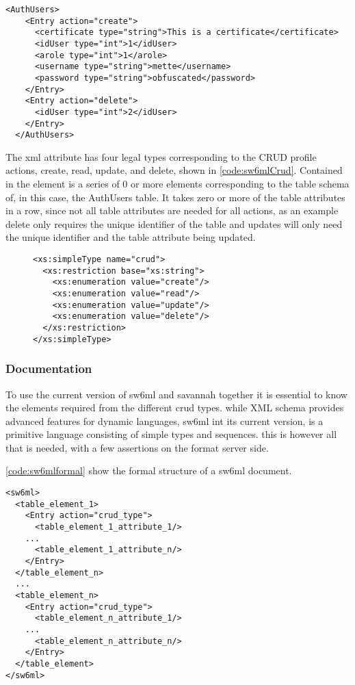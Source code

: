 \begin{Code}
\begin{lstlisting}[label=code:sw6mlExample01,caption=Example of sw6ml syntax]
 <AuthUsers>
    <Entry action="create">
      <certificate type="string">This is a certificate</certificate>
      <idUser type="int">1</idUser>
      <arole type="int">1</arole>
      <username type="string">mette</username>
      <password type="string">obfuscated</password>
    </Entry>
    <Entry action="delete">
      <idUser type="int">2</idUser>
    </Entry>
  </AuthUsers>
\end{lstlisting}
\end{Code}
The  xml attribute has four legal types corresponding to the CRUD profile actions, create, read, update, and delete, shown in \autoref{code:sw6mlCrud}.
Contained in the   element is a series of 0 or more elements corresponding to the table schema of, in this case, the AuthUsers table.
It takes zero or more of the table attributes in a row, since not all table attributes are needed for all actions, as an example delete only requires the unique identifier of the table and
updates will only need the unique identifier and the table attribute being updated.
\begin{figure}[H]
\begin{lstlisting}[label=code:sw6mlCrud,caption=sw6ml crud simple type]
 <xs:simpleType name="crud">
  <xs:restriction base="xs:string">
    <xs:enumeration value="create"/>
    <xs:enumeration value="read"/>
    <xs:enumeration value="update"/>
    <xs:enumeration value="delete"/>
  </xs:restriction>
</xs:simpleType>
\end{lstlisting}
\end{figure}

\subsubsection{Documentation}
\label{sw6mlusage}
To use the current version of sw6ml and savannah together it is essential to know the elements required from the different crud types.
while XML schema provides advanced features for dynamic languages, sw6ml int its current version, is a primitive language consisting of simple types and sequences.
this is however all that is needed, with a few assertions on the format server side.

\autoref{code:sw6mlformal} show the formal structure of a sw6ml document.
\begin{Code}
\begin{lstlisting}[label=code:sw6mlformal,caption=root and table elements]
<sw6ml> 
  <table_element_1>
    <Entry action="crud_type">
      <table_element_1_attribute_1/>
	...
      <table_element_1_attribute_n/>
    </Entry>
  </table_element_n>
  ...
  <table_element_n>
    <Entry action="crud_type">
      <table_element_n_attribute_1/>
	...
      <table_element_n_attribute_n/>
    </Entry>
  </table_element>
</sw6ml>
\end{lstlisting}
\end{Code}

